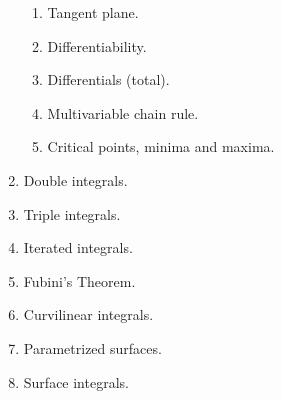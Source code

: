\documentclass{article}
\begin{document}
\begin{enumerate}
\begin{enumerate}
\item Tangent plane.
\item Differentiability.
\item Differentials (total).
\item Multivariable chain rule.
\item Critical points, minima and maxima.
\end{enumerate}
\item Double integrals.
\item Triple integrals.
\item Iterated integrals.
\item Fubini's Theorem.
\item Curvilinear integrals.
\item Parametrized surfaces.
\item Surface integrals.
\end{enumerate}
\end{document}
